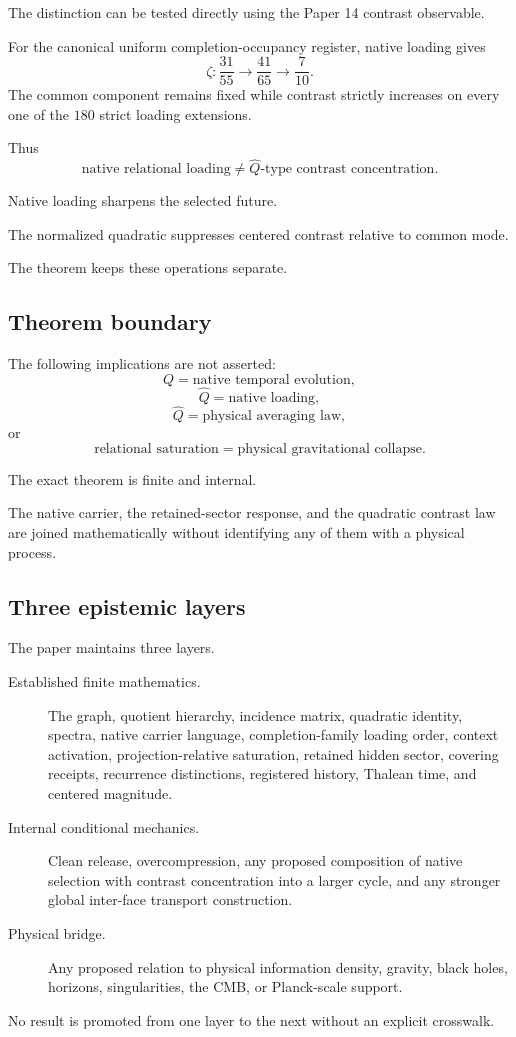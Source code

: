 The distinction can be tested directly using the Paper 14 contrast
observable.

For the canonical uniform completion-occupancy register, native
loading gives
\[
\zeta:
\frac{31}{55}
\longrightarrow
\frac{41}{65}
\longrightarrow
\frac{7}{10}.
\]
The common component remains fixed while contrast strictly increases
on every one of the \(180\) strict loading extensions.

Thus
\[
\text{native relational loading}
\neq
\text{\(\widehat Q\)-type contrast concentration}.
\]

Native loading sharpens the selected future.

The normalized quadratic suppresses centered contrast relative to
common mode.

The theorem keeps these operations separate.

\subsection{Theorem boundary}

The following implications are not asserted:
\[
Q
=
\text{native temporal evolution},
\]
\[
\widehat Q
=
\text{native loading},
\]
\[
\widehat Q
=
\text{physical averaging law},
\]
or
\[
\text{relational saturation}
=
\text{physical gravitational collapse}.
\]

The exact theorem is finite and internal.

The native carrier, the retained-sector response, and the quadratic
contrast law are joined mathematically without identifying any of
them with a physical process.

\subsection{Three epistemic layers}

The paper maintains three layers.

\begin{description}

\item[Established finite mathematics.]
The graph, quotient hierarchy, incidence matrix, quadratic identity,
spectra, native carrier language, completion-family loading order,
context activation, projection-relative saturation, retained hidden
sector, covering receipts, recurrence distinctions, registered
history, Thalean time, and centered magnitude.

\item[Internal conditional mechanics.]
Clean release, overcompression, any proposed composition of native
selection with contrast concentration into a larger cycle, and any
stronger global inter-face transport construction.

\item[Physical bridge.]
Any proposed relation to physical information density, gravity,
black holes, horizons, singularities, the CMB, or Planck-scale
support.

\end{description}

No result is promoted from one layer to the next without an explicit
crosswalk.

